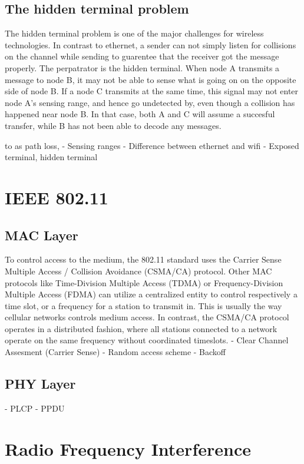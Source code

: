 \documentclass[a4paper,UKenglish]{report}
\begin{document}
\subsection{The hidden terminal problem}
The hidden terminal problem is one of the major challenges for wireless technologies. In contrast to ethernet, a sender can not 
simply listen for collisions on the channel while sending to guarentee that the receiver got the message properly.
The perpatrator is the hidden terminal. When node A transmits a message to node B, it may not be able to sense what is going on
on the opposite side of node B. If a node C transmits at the same time, this signal may not enter node A's sensing range, and
hence go undetected by, even though a collision has happened near node B. In that case, both A and C will assume a succesful
transfer, while B has not been able to decode any messages. 






to as path loss, 
- Sensing ranges
- Difference between ethernet and wifi
- Exposed terminal, hidden terminal
\section{IEEE 802.11}
\subsection{MAC Layer}
To control access to the medium, the 802.11 standard uses the Carrier Sense Multiple Access / Collision Avoidance (CSMA/CA) protocol. Other MAC 
protocols like Time-Division Multiple Access (TDMA) or Frequency-Division Multiple Access (FDMA) can utilize a centralized entity to control
respectively a time slot, or a frequency for a station to transmit in. This is usually the way cellular networks controls medium access.
In contrast, the CSMA/CA protocol operates in a distributed fashion, where all stations connected to a network operate on the same frequency without coordinated timeslots.
- Clear Channel Assesment (Carrier Sense)
- Random access scheme
- Backoff

\subsection{PHY Layer}
- PLCP
- PPDU

\section{Radio Frequency Interference}
\end{document}
